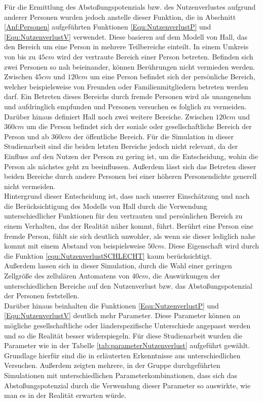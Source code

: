 Für die Ermittlung des Abstoßungspotenzials bzw. des Nutzenverlustes aufgrund anderer Personen wurden jedoch anstelle dieser Funktion, die in Abschnitt \ref{Anf:Personen} aufgeführten Funktionen \ref{Equ:NutzenverlustP} und \ref{Equ:NutzenverlustV} verwendet. Diese basieren auf dem Modell von Hall, das den Bereich um eine Person in mehrere Teilbereiche einteilt. In einem Umkreis von bis zu $45cm$ wird der vertraute Bereich einer Person betreten. Befinden sich zwei Personen so nah beieinander, können Berührungen nicht vermieden werden. Zwischen $45cm$ und $120cm$ um eine Person befindet sich der persönliche Bereich, welcher beispielsweise von Freunden oder Familienmitgliedern betreten werden darf. Ein Betreten dieses Bereichs durch fremde Personen wird als unangenehm und aufdringlich empfunden und Personen versuchen es folglich zu vermeiden. Darüber hinaus definiert Hall noch zwei weitere Bereiche. Zwischen $120cm$ und $360cm$ um die Person befindet sich der soziale oder gesellschaftliche Bereich der Person und ab $360cm$ der öffentliche Bereich. Für die Simulation in dieser Studienarbeit sind die beiden letzten Bereiche jedoch nicht relevant, da der Einfluss auf den Nutzen der Person zu gering ist, um die Entscheidung, wohin die Person als nächstes geht zu beeinflussen. Außerdem lässt sich das Betreten dieser beiden Bereiche durch andere Personen bei einer höheren Personendichte generell nicht vermeiden.\\
Hintergrund dieser Entscheidung ist, dass nach unserer Einschätzung und nach \cite{VONSIVERS2015104} die Berücksichtigung des Modells von Hall durch die Verwendung unterschiedlicher Funktionen für den vertrauten und persönlichen Bereich zu einem Verhalten, das der Realität näher kommt, führt. Berührt eine Person eine fremde Person, fühlt sie sich deutlich unwohler, als wenn sie dieser lediglich nahe kommt mit einem Abstand von beispielsweise $50cm$. Diese Eigenschaft wird durch die Funktion \ref{equ:NutzenverlustSCHLECHT} kaum berücksichtigt.\\
Außerdem lassen sich in dieser Simulation, durch die Wahl einer geringen Zellgröße des zellulären Automatens von $40 cm$, die Auswirkungen der unterschiedlichen Bereiche auf den Nutzenverlust bzw. das Abstoßungspotenzial der Personen feststellen. \\
Darüber hinaus beinhalten die Funktionen \ref{Equ:NutzenverlustP} und \ref{Equ:NutzenverlustV} deutlich mehr Parameter. Diese Parameter können an mögliche gesellschaftliche oder länderspezifische Unterschiede angepasst werden und so die Realität besser widerspiegeln. Für diese Studienarbeit wurden die Parameter wie in der Tabelle \ref{tab:parameterNutzenverlust} aufgeführt gewählt. Grundlage hierfür sind die in \cite{VONSIVERS2015104} erläuterten Erkenntnisse aus unterschiedlichen Versuchen. Außerdem zeigten mehrere, in der Gruppe durchgeführten Simulationen mit unterschiedlichen Parameterkombinationen, dass sich das Abstoßungspotenzial durch die Verwendung dieser Parameter so auswirkte, wie man es in der Realität erwarten würde. \\ 
  
